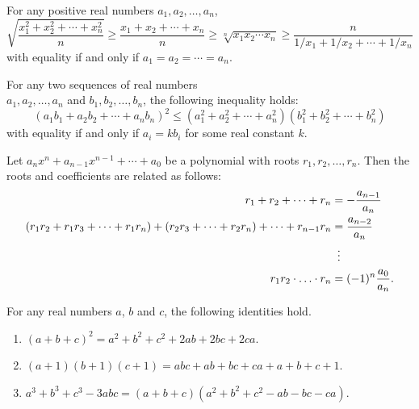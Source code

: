 \begin{theorem}
    \label{thm: amgm}
    For any positive real numbers $a_1, a_2, \ldots, a_n$,
    \[\sqrt{\frac{x_1^2 + x_2^2 + \cdots + x_n^2}{n}} \geq \frac{x_1 + x_2 + \cdots + x_n}{n} \geq \sqrt[n]{x_1 x_2 \cdots x_n} \geq \frac{n}{1/x_1 + 1/x_2 + \cdots + 1/x_n}\]
    with equality if and only if $a_1 = a_2 = \cdots = a_n$.
\end{theorem}

\begin{theorem}
    \label{thm: cs}
    For any two sequences of real numbers\\ $a_1, a_2, \ldots, a_n$ and $b_1, b_2, \ldots, b_n$, the following inequality holds:
    \[ (a_1 b_1 + a_2 b_2 + \cdots + a_n b_n)^2 \leq (a_1^2 + a_2^2 + \cdots + a_n^2)(b_1^2 + b_2^2 + \cdots +b_n^2) \]
    with equality if and only if $a_i = kb_i$ for some real constant $k$.
\end{theorem}

\begin{theorem}
    \label{thm: vieta}
    Let $a_{n}x^{n}+a_{n-1}x^{n-1}+\cdots + a_{0}$ be a polynomial with roots $r_{1},r_{2},\ldots,r_{n}$. Then the roots and coefficients are related as follows:
    \begin{align*}
        r_{1}+r_{2}+\cdots+r_{n}&=-\frac{a_{n-1}}{a_{n}}\\
        (r_{1}r_{2}+r_{1}r_{3}+\cdots+r_{1}r_{n})+(r_{2}r_{3}+\cdots+r_{2}r_{n})+\cdots+r_{n-1}r_{n}&=\frac{a_{n-2}}{a_{n}}\\
        &\vdotswithin{=}\\
        r_{1}r_{2}\cdot \ldots \cdot r_{n}&=(-1)^{n}\frac{a_{0}}{a_{n}}.
    \end{align*}
\end{theorem}

\begin{theorem}
    \label{thm: ruleofsigns}
\end{theorem}

\begin{theorem}
    \label{thm: fundamentalthmofalg}
\end{theorem}

\newpage
\begin{technique}
    \label{teq: algidentities}
    For any real numbers $a$, $b$ and $c$, the following identities hold.
    \begin{enumerate}
        \item $(a + b + c)^2 = a^2 + b^2 + c^2 + 2ab + 2bc + 2ca$.
        \item $(a + 1)(b + 1)(c + 1) = abc + ab + bc + ca + a + b + c + 1$.
        \item $a^3 + b^3 + c^3 - 3abc = (a + b + c)(a^2 + b^2 + c^2 - ab - bc - ca)$. 
    \end{enumerate}
\end{technique}

